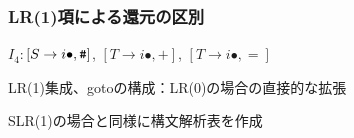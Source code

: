\documentclass[dvipdfmx,cjk]{beamer}
\begin{document}
\begin{frame}
  \frametitle{LR(1)項による還元の区別}

  $I_4:$\quad $[S\rightarrow i\bullet,\texttt{\#}]$,
  $[T\rightarrow i\bullet,\mathtt{+}]$,
  $[T\rightarrow i\bullet,\mathtt{=}]$

  \begin{list}{}{}
    \item {}
    \item {}
  \end{list}

  \vspace*{10pt}

  LR(1)集成、gotoの構成：LR(0)の場合の直接的な拡張

  \vspace*{10pt}

  SLR(1)の場合と同様に構文解析表を作成
\end{frame}


\end{document}

